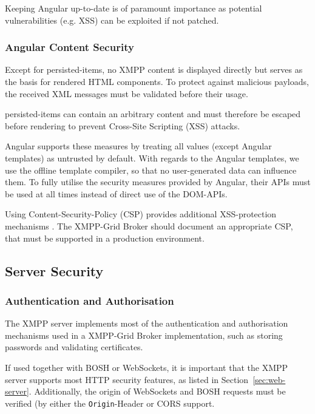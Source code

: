 Keeping Angular up-to-date is of paramount importance as potential vulnerabilities (e.g. XSS) can be exploited if not patched.

\subsubsection{Angular Content Security}

Except for \glspl{persisted-item}, no XMPP content is displayed directly but serves as the basis for rendered HTML components.
To protect against malicious payloads, the received XML messages must be validated before their usage.

\Glspl{persisted-item} can contain an arbitrary content and must therefore be escaped before rendering to prevent Cross-Site Scripting (XSS) attacks.

Angular supports these measures by treating all values (except Angular templates) as untrusted by default.
With regards to the Angular templates, we use the offline template compiler, so that no user-generated data can influence them. To fully utilise the security measures provided by Angular, their APIs must be used at all times instead of direct use of the DOM-APIs.~\cite{angular-security}

Using Content-Security-Policy (CSP) provides additional XSS-protection mechanisms \cite{w3c-csp}.
The XMPP-Grid Broker should document an appropriate CSP, that must be supported in a production environment.

\subsection{Server Security}

\subsubsection{Authentication and Authorisation}

The XMPP server implements most of the authentication and authorisation mechanisms used in a XMPP-Grid Broker implementation, such as storing passwords and validating certificates.

If used together with BOSH or WebSockets, it is important that the XMPP server supports most HTTP security features, as listed in Section~\ref{sec:web-server}. Additionally, the origin of WebSockets and BOSH requests must be verified (by either the \texttt{Origin}-Header or CORS support.~\cite{rfc6455}\cite{cross-origin-resource-sharing}

